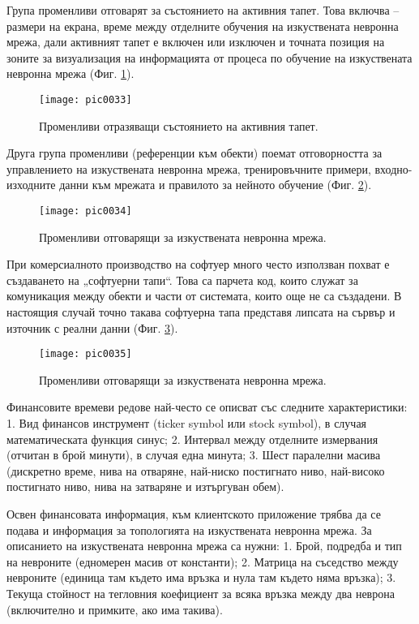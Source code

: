 Група променливи отговарят за състоянието на активния тапет. Това включва – размери на екрана, време между отделните обучения на изкуствената невронна мрежа, дали активният тапет е включен или изключен и точната позиция на зоните за визуализация на информацията от процеса по обучение на изкуствената невронна мрежа (Фиг. \ref{fig:pic0033}). 

\begin{figure}[h]
  \centering
  \texttt{[image: pic0033]}
  \caption{Променливи отразяващи състоянието на активния тапет.}
\label{fig:pic0033}
\end{figure}
\FloatBarrier

Друга група променливи (референции към обекти) поемат отговорността за управлението на изкуствената невронна мрежа, тренировъчните примери, входно-изходните данни към мрежата и правилото за нейното обучение (Фиг. \ref{fig:pic0034}).

\begin{figure}[h]
  \centering
  \texttt{[image: pic0034]}
  \caption{Променливи отговарящи за изкуствената невронна мрежа.}
\label{fig:pic0034}
\end{figure}
\FloatBarrier

При комерсиалното производство на софтуер много често използван похват е създаването на „софтуерни тапи“. Това са парчета код, които служат за комуникация между обекти и части от системата, които още не са създадени. В настоящия случай точно такава софтуерна тапа представя липсата на сървър и източник с реални данни  (Фиг. \ref{fig:pic0035}).  

\begin{figure}[h]
  \centering
  \texttt{[image: pic0035]}
  \caption{Променливи отговарящи за изкуствената невронна мрежа.}
\label{fig:pic0035}
\end{figure}
\FloatBarrier

Финансовите времеви редове най-често се описват със следните характеристики: 1. Вид финансов инструмент (ticker symbol или stock symbol), в случая математическата функция синус; 2. Интервал между отделните измервания (отчитан в брой минути), в случая една минута; 3. Шест паралелни масива (дискретно време, нива на отваряне, най-ниско постигнато ниво, най-високо постигнато ниво, нива на затваряне и изтъргуван обем).

Освен финансовата информация, към клиентското приложение трябва да се подава и информация за топологията на изкуствената невронна мрежа. За описанието на изкуствената невронна мрежа са нужни: 1. Брой, подредба и тип на невроните (едномерен масив от константи); 2. Матрица на съседство между невроните (единица там където има връзка и нула там където няма връзка); 3. Текуща стойност на тегловния коефициент за всяка връзка между два неврона (включително и примките, ако има такива). 

